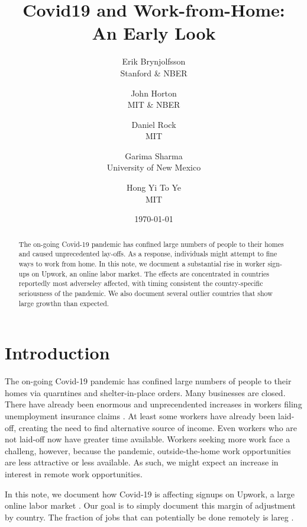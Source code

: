\documentclass[12pt]{article}
\newcommand{\covid}{Covid-19}
\begin{document}
 

\title{Covid19 and Work-from-Home:\\ An Early Look}

\date{\today}

\author{Erik Brynjolfsson\\Stanford \& NBER \and John Horton\\MIT \& NBER \and Daniel Rock\\MIT \and Garima Sharma\\University of New Mexico \and Hong Yi To Ye\\MIT}

\maketitle

\begin{abstract}
  \noindent The on-going \covid{} pandemic has confined large numbers of people to their homes and caused unprecedented lay-offs.
  As a response, individuals might attempt to fine ways to work from home.
  In this note, we document a substantial rise in worker sign-ups on Upwork, an online labor market.
  The effects are concentrated in countries reportedly most adverseley affected, with timing consistent the country-specific seriousness of the pandemic.
  We also document several outlier countries that show large growthn than expected. 
  \newline 
\end{abstract} 

\onehalfspacing 

\section{Introduction}
The on-going \covid{} pandemic has confined large numbers of people to their homes via quarntines and shelter-in-place orders.
Many businesses are closed. 
There have already been enormous and unprecendented increases in workers filing unemployment insurance claims \citep{goldsmith2020}. 
At least some workers have already been laid-off, creating the need to find alternative source of income.
Even workers who are not laid-off now have greater time available. 
Workers seeking more work face a challeng, however, because the pandemic, outside-the-home work opportunities are less attractive or less available.
As such, we might expect an increase in interest in remote work opportunities. 

In this note, we document how \covid{} is affecting signups on Upwork, a large online labor market \cite{horton2010online}.
Our goal is to simply document this margin of adjustment by country.
The fraction of jobs that can potentially be done remotely is lareg \cite{dingel2020}.



\newpage \clearpage


\end{document}
